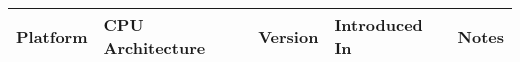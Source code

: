 \begin{table}
\begin{tabular}{ | p{3cm} | l | l | l | p{4cm} | }
Platform & CPU Architecture & Version & Introduced In & Notes \\ \hline

\end{tabular}
\end{table}

